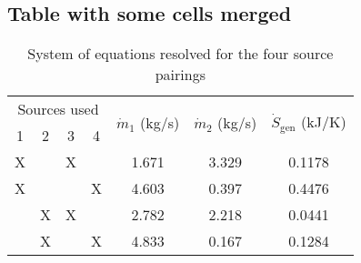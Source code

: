 \subsection{Table with some cells merged}

\begin{table}[H]
\begin{center}

\caption{\small System of equations resolved for the four source pairings}

\vspace{5mm}

\begin{tabular}{ccccccc}

\toprule

\multicolumn{4}{c}{Sources used} 
& \multirow{2}{*}{$\dot{m}_1$ (kg/s)} 
& \multirow{2}{*}{$\dot{m}_2$ (kg/s)} 
& \multirow{2}{*}{$\dot{S}_{\text{gen}}$ (kJ/K)} \\

1 & 2 & 3 & 4 &&& \\

\midrule

X&&X&& 1.671 & 3.329 & 0.1178 \\
X&&&X& 4.603 & 0.397 & 0.4476 \\
&X&X&& 2.782 & 2.218 & 0.0441 \\
&X&&X& 4.833 & 0.167 & 0.1284 \\

\bottomrule

\end{tabular}
\end{center}
\end{table}